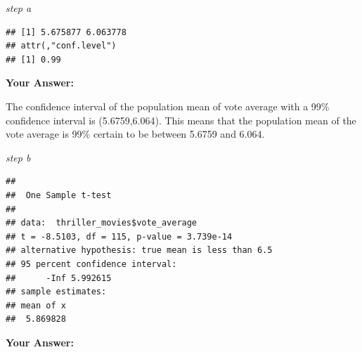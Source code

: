 \documentclass[
]{article}
\newenvironment{Shaded}{\begin{snugshade}}{\end{snugshade}}
\newcommand{\AttributeTok}[1]{\textcolor[rgb]{0.13,0.29,0.53}{#1}}
\newcommand{\FloatTok}[1]{\textcolor[rgb]{0.00,0.00,0.81}{#1}}
\newcommand{\FunctionTok}[1]{\textcolor[rgb]{0.13,0.29,0.53}{\textbf{#1}}}
\newcommand{\NormalTok}[1]{#1}
\newcommand{\OtherTok}[1]{\textcolor[rgb]{0.56,0.35,0.01}{#1}}
\newcommand{\SpecialCharTok}[1]{\textcolor[rgb]{0.81,0.36,0.00}{\textbf{#1}}}
\newcommand{\StringTok}[1]{\textcolor[rgb]{0.31,0.60,0.02}{#1}}
\begin{document}
\emph{step a}

\begin{Shaded}
\end{Shaded}

\begin{verbatim}
## [1] 5.675877 6.063778
## attr(,"conf.level")
## [1] 0.99
\end{verbatim}

\textbf{Your Answer:}

The confidence interval of the population mean of vote average with a
99\% confidence interval is (5.6759,6.064). This means that the
population mean of the vote average is 99\% certain to be between 5.6759
and 6.064.

\emph{step b}

\begin{Shaded}
\end{Shaded}

\begin{verbatim}
## 
##  One Sample t-test
## 
## data:  thriller_movies$vote_average
## t = -8.5103, df = 115, p-value = 3.739e-14
## alternative hypothesis: true mean is less than 6.5
## 95 percent confidence interval:
##      -Inf 5.992615
## sample estimates:
## mean of x 
##  5.869828
\end{verbatim}

\textbf{Your Answer:}
\end{document}
